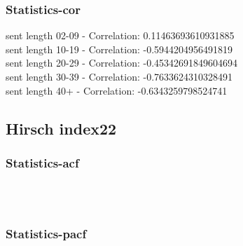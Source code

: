 \documentclass{article}%
\begin{document}
%
\newpage%
\subsubsection{Statistics{-}cor}%
\label{ssubsec:Statistics{-}cor}%
\noindent%
sent length 02-09 - Correlation: 0.11463693610931885\\%
sent length 10-19 - Correlation: -0.5944204956491819\\%
sent length 20-29 - Correlation: -0.45342691849604694\\%
sent length 30-39 - Correlation: -0.7633624310328491\\%
sent length 40+ - Correlation: -0.6343259798524741\\

%
\newpage

%
\subsection{Hirsch index22}%
\label{subsec:Hirschindex22}%
\subsubsection{Statistics{-}acf}%
\label{ssubsec:Statistics{-}acf}%


\begin{figure}[ht]%
\centering%
\setlength{\abovecaptionskip}{-35pt}%
%
%
\\%
%
%
\\%
%
\end{figure}

%
\newpage%
\subsubsection{Statistics{-}pacf}%
\label{ssubsec:Statistics{-}pacf}%
\end{document}
